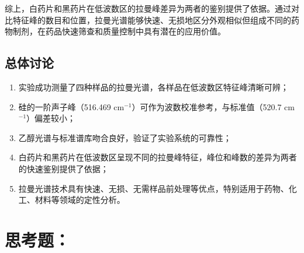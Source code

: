 \noindent 综上，白药片和黑药片在低波数区的拉曼峰差异为两者的鉴别提供了依据。通过对比特征峰的数目和位置，拉曼光谱能够快速、无损地区分外观相似但组成不同的药物制剂，在药品快速筛查和质量控制中具有潜在的应用价值。

\subsection{总体讨论}

\begin{enumerate}[label=\arabic* 、, leftmargin=4em, labelsep=0pt]
    \item 实验成功测量了四种样品的拉曼光谱，各样品在低波数区特征峰清晰可辨；
    \item 硅的一阶声子峰（516.469 cm$^{-1}$）可作为波数校准参考，与标准值（520.7 cm$^{-1}$）偏差较小；
    \item 乙醇光谱与标准谱库吻合良好，验证了实验系统的可靠性；
    \item 白药片和黑药片在低波数区呈现不同的拉曼峰特征，峰位和峰数的差异为两者的快速鉴别提供了依据；
    \item 拉曼光谱技术具有快速、无损、无需样品前处理等优点，特别适用于药物、化工、材料等领域的定性分析。
\end{enumerate}

\section{思考题：}

